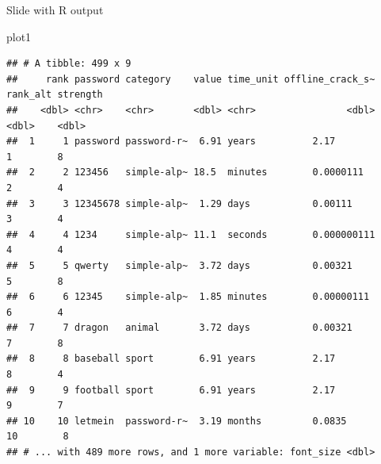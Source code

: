 \documentclass[10pt,ignorenonframetext,aspectratio=169]{beamer}
\newenvironment{Shaded}{\begin{snugshade}}{\end{snugshade}}
\newcommand{\NormalTok}[1]{#1}
\renewenvironment{Shaded}{\color{black}\begin{snugshade}\color{black}}{\end{snugshade}}
\begin{document}
\begin{frame}[fragile]{Slide with R output}
\begin{Shaded}
\begin{Highlighting}[]
\NormalTok{  plot1}
\end{Highlighting}
\end{Shaded}

\begin{verbatim}
## # A tibble: 499 x 9
##     rank password category    value time_unit offline_crack_s~ rank_alt strength
##    <dbl> <chr>    <chr>       <dbl> <chr>                <dbl>    <dbl>    <dbl>
##  1     1 password password-r~  6.91 years          2.17               1        8
##  2     2 123456   simple-alp~ 18.5  minutes        0.0000111          2        4
##  3     3 12345678 simple-alp~  1.29 days           0.00111            3        4
##  4     4 1234     simple-alp~ 11.1  seconds        0.000000111        4        4
##  5     5 qwerty   simple-alp~  3.72 days           0.00321            5        8
##  6     6 12345    simple-alp~  1.85 minutes        0.00000111         6        4
##  7     7 dragon   animal       3.72 days           0.00321            7        8
##  8     8 baseball sport        6.91 years          2.17               8        4
##  9     9 football sport        6.91 years          2.17               9        7
## 10    10 letmein  password-r~  3.19 months         0.0835            10        8
## # ... with 489 more rows, and 1 more variable: font_size <dbl>
\end{verbatim}
\end{frame}
\end{document}

